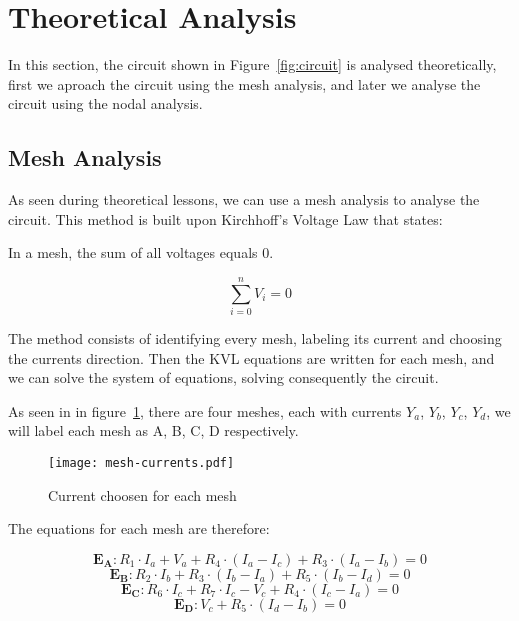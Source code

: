 \section{Theoretical Analysis}
\label{sec:analysis}

In this section, the circuit shown in Figure~\ref{fig:circuit} is analysed
theoretically, first we aproach the circuit using the mesh analysis, and later we analyse the circuit using the nodal analysis.

\subsection{Mesh Analysis}

As seen during theoretical lessons, we can use a mesh analysis to analyse the circuit.
This method is built upon Kirchhoff's Voltage Law that states:

In a mesh, the sum of all voltages equals 0.

\begin{equation}
  \sum_{i=0}^{n} V_i = 0
  \label{eq:kvl}
\end{equation}

The method consists of identifying every mesh, labeling its current and choosing the currents direction.
Then the KVL equations are written for each mesh, and we can solve the system of equations, solving consequently the circuit.

As seen in in figure~\ref{fig:mesh}, there are four meshes, each with currents $Y_a$, $Y_b$, $Y_c$, $Y_d$, 
we will label each mesh as A, B, C, D respectively.
\begin{figure}[H] \centering
  \texttt{[image: mesh-currents.pdf]}
  \caption{Current choosen for each mesh}
  \label{fig:mesh}
  \end{figure}

The equations for each mesh are therefore:

\begin{equation}
  \mathbf{E_A} : R_1 \cdot I_a + V_a + R_4 \cdot ( I_a -I_c )+ R_3 \cdot ( I_a - I_b ) = 0
  \label{eq:kvlA}
\end{equation}
\begin{equation}
  \mathbf{E_B} : R_2 \cdot I_b + R_3 \cdot ( I_b - I_a ) + R_5 \cdot ( I_b - I_d ) = 0
  \label{eq:kvlB}
\end{equation}
\begin{equation}
  \mathbf{E_C} : R_6 \cdot I_c + R_7 \cdot I_c - V_c +  R_4 \cdot ( I_c -I_a ) = 0
  \label{eq:kvlC}
\end{equation}
\begin{equation}
  \mathbf{E_D} : V_c + R_5 \cdot ( I_d - I_b )= 0
  \label{eq:kvlD}
\end{equation}



